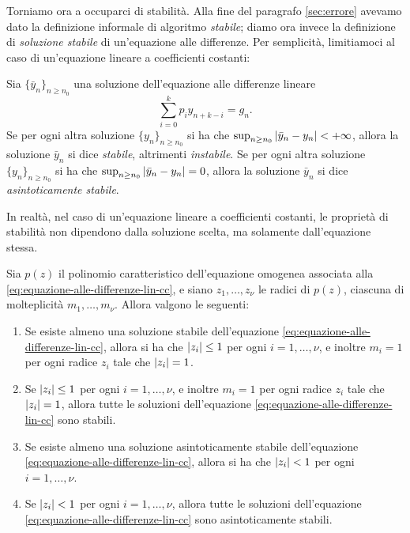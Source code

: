 Torniamo ora a occuparci di stabilità.
Alla fine del paragrafo \ref{sec:errore} avevamo dato la definizione
informale di algoritmo \emph{stabile}; diamo ora invece la definizione
di \emph{soluzione stabile} di un'equazione alle differenze.
Per semplicità, limitiamoci al caso di un'equazione lineare
a coefficienti costanti:

\begin{defi}
Sia $\{\bar{y}_n\}_{n \geq n_0}$ una soluzione dell'equazione alle differenze lineare
\begin{equation} \label{eq:equazione-alle-differenze-lin-cc}
\sum_{i=0}^k p_i y_{n+k-i} = g_n.
\end{equation}
Se per ogni altra soluzione $\{y_n\}_{n \geq n_0}$ si ha che
$\sup_{n \geq n_0} \left\lvert\bar{y}_n-y_n\right\rvert < +\infty$, allora
la soluzione $\bar{y}_n$ si dice \emph{stabile}, altrimenti \emph{instabile}.
Se per ogni altra soluzione $\{y_n\}_{n \geq n_0}$ si ha che
$\sup_{n \geq n_0} \left\lvert\bar{y}_n-y_n\right\rvert = 0$, allora la soluzione $\bar{y}_n$
si dice \emph{asintoticamente stabile}.
\end{defi}

In realtà, nel caso di un'equazione lineare a coefficienti costanti,
le proprietà di stabilità non dipendono dalla soluzione scelta,
ma solamente dall'equazione stessa.

\begin{teor}
\label{teor:sol-stabili-eq-alle-diff-lineare}
Sia $p(z)$ il polinomio caratteristico dell'equazione omogenea
associata alla \eqref{eq:equazione-alle-differenze-lin-cc},
e siano $z_1,\dots,z_\nu$ le radici di $p(z)$, ciascuna di molteplicità
$m_1,\dots,m_\nu$. Allora valgono le seguenti:
\begin{enumerate}
\item Se esiste almeno una soluzione stabile dell'equazione
	\eqref{eq:equazione-alle-differenze-lin-cc}, allora si ha che
	$\left\lvert z_i\right\rvert \leq 1$ per ogni $i = 1,\dots,\nu$, e inoltre
	$m_i = 1$ per ogni radice $z_i$ tale che $\left\lvert z_i\right\rvert = 1$.
\item Se $\left\lvert z_i\right\rvert \leq 1$ per ogni $i = 1,\dots,\nu$, e inoltre
	$m_i = 1$ per ogni radice $z_i$ tale che $\left\lvert z_i\right\rvert = 1$, allora
	tutte le soluzioni dell'equazione \eqref{eq:equazione-alle-differenze-lin-cc}
	sono stabili.
\item Se esiste almeno una soluzione asintoticamente stabile dell'equazione
	\eqref{eq:equazione-alle-differenze-lin-cc}, allora si ha che
	$\left\lvert z_i\right\rvert < 1$ per ogni $i = 1,\dots,\nu$.
\item Se $\left\lvert z_i\right\rvert < 1$ per ogni $i = 1,\dots,\nu$, allora tutte le soluzioni
	dell'equazione \eqref{eq:equazione-alle-differenze-lin-cc}
	sono asintoticamente stabili.
\end{enumerate}
\end{teor}

